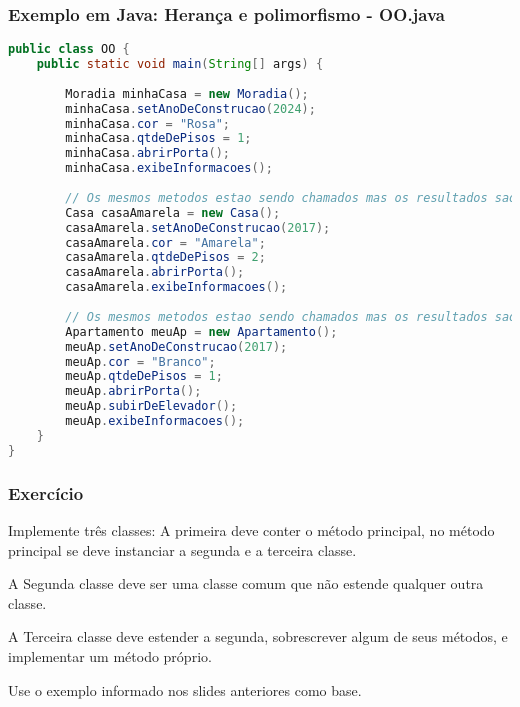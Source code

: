 \begin{frame}[fragile]
	\frametitle{Exemplo em Java: Herança e polimorfismo - OO.java}
	\begin{lstlisting}[language=java]
public class OO {
	public static void main(String[] args) {
		
		Moradia minhaCasa = new Moradia();
		minhaCasa.setAnoDeConstrucao(2024);
		minhaCasa.cor = "Rosa";
		minhaCasa.qtdeDePisos = 1;
		minhaCasa.abrirPorta();
		minhaCasa.exibeInformacoes();
		
		// Os mesmos metodos estao sendo chamados mas os resultados sao diferentes gracas a heranca e ao polimorfismo
		Casa casaAmarela = new Casa();
		casaAmarela.setAnoDeConstrucao(2017);
		casaAmarela.cor = "Amarela";
		casaAmarela.qtdeDePisos = 2;
		casaAmarela.abrirPorta();
		casaAmarela.exibeInformacoes();
		
		// Os mesmos metodos estao sendo chamados mas os resultados sao diferentes gracas a heranca e ao polimorfismo e mais, tambem ha um metodo a mais: subirDeElevador()
		Apartamento meuAp = new Apartamento();
		meuAp.setAnoDeConstrucao(2017);
		meuAp.cor = "Branco";
		meuAp.qtdeDePisos = 1;
		meuAp.abrirPorta();
		meuAp.subirDeElevador();
		meuAp.exibeInformacoes();
	}
}
	\end{lstlisting}
\end{frame}

\begin{frame}
	\frametitle{Exercício}
	\par Implemente três classes:
	A primeira deve conter o método principal, no método principal se deve instanciar a segunda e a terceira classe.
	\par A Segunda classe deve ser uma classe comum que não estende qualquer  outra classe.
	\par A Terceira classe deve estender a segunda, sobrescrever algum de seus métodos, e implementar um método próprio. 
	\par Use o exemplo informado nos slides anteriores como base. 
\end{frame}
